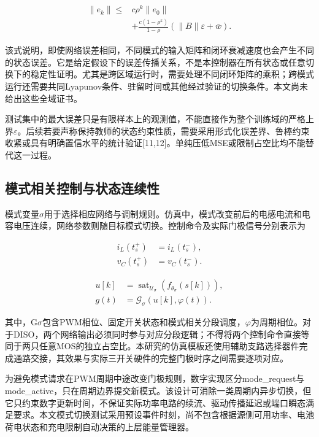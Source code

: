 \documentclass[UTF8,fontset=fandol,a4paper,twocolumn,10pt]{ctexart}
\begin{document}
\begin{equation}\begin{aligned}\|e_k\|\le{}&c\rho^k\|e_0\|\\ &+\frac{c(1-\rho^k)}{1-\rho}(\|B\|\varepsilon+\bar w).\end{aligned}\label{eq:33}\end{equation}

该式说明，即使网络误差相同，不同模式的输入矩阵和闭环衰减速度也会产生不同的状态误差。它是给定假设下的误差传播关系，不是本控制器在所有状态或任意切换下的稳定性证明。尤其是跨区域运行时，需要处理不同闭环矩阵的乘积；跨模式运行还需要共同Lyapunov条件、驻留时间或其他经过验证的切换条件。本文尚未给出这些全域证书。

测试集中的最大误差只是有限样本上的观测值，不能直接作为整个训练域的严格上界$\varepsilon$。后续若要声称保持教师的状态约束性质，需要采用形式化误差界、鲁棒约束收紧或具有明确置信水平的统计验证[11,12]。单纯压低MSE或限制占空比均不能替代这一过程。


\subsection{模式相关控制与状态连续性}

模式变量$\sigma$用于选择相应网络与调制规则。仿真中，模式改变前后的电感电流和电容电压连续，网络参数则随目标模式切换。控制命令及实际门极信号分别表示为

\begin{equation}\begin{aligned}i_L(t_s^+)&=i_L(t_s^-),\\ v_C(t_s^+)&=v_C(t_s^-).\end{aligned}\label{eq:34}\end{equation}

\begin{equation}\begin{aligned}u[k]&=\operatorname{sat}_{\mathcal U_\sigma}(f_{\theta_\sigma}(s[k])),\\g(t)&=\mathcal G_\sigma(u[k],\varphi(t)).\end{aligned}\label{eq:35}\end{equation}

其中，G$\sigma$包含PWM相位、固定开关状态和模式相关分段调度，$\varphi$为周期相位。对于DISO，两个网络输出必须同时参与对应分段逻辑；不得将两个控制命令直接等同于两只任意MOS的独立占空比。本研究的仿真模板还使用辅助支路选择器件完成通路交接，其效果与实际三开关硬件的完整门极时序之间需要逐项对应。

为避免模式请求在PWM周期中途改变门极规则，数字实现区分mode\_request与mode\_active，只在周期边界提交新模式。该设计可消除一类周期内异步切换，但它只约束数字更新时间，不保证实际功率电路的续流、驱动传播延迟或端口瞬态满足要求。本文模式切换测试采用预设事件时刻，尚不包含根据源侧可用功率、电池荷电状态和充电限制自动决策的上层能量管理器。
\end{document}
